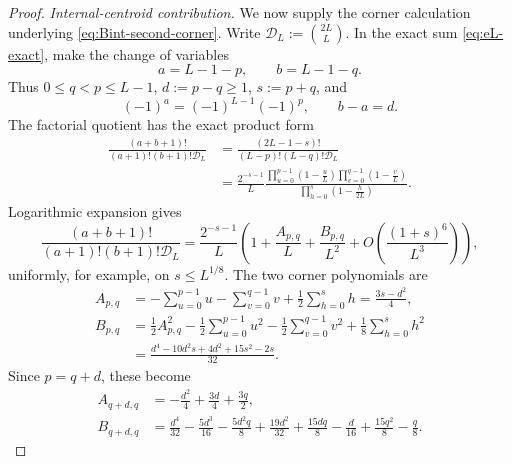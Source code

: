 \documentclass[10pt,a4paper]{amsart}
\begin{document}
\begin{proof}
\medskip
\noindent\emph{Internal-centroid contribution.}
We now supply the corner calculation underlying
\eqref{eq:Bint-second-corner}.  Write
\(\mathscr D_L:=\binom{2L}{L}\).  In the exact sum
\eqref{eq:eL-exact}, make the change of variables
\[
 a=L-1-p,\qquad b=L-1-q.
\]
Thus \(0\le q<p\le L-1\), \(d:=p-q\ge1\), \(s:=p+q\), and
\[
 (-1)^a=(-1)^{L-1}(-1)^p,\qquad b-a=d.
\]
The factorial quotient has the exact product form
\begin{align}
 \frac{(a+b+1)!}{(a+1)!(b+1)!\mathscr D_L}
 &=\frac{(2L-1-s)!}{(L-p)!(L-q)!\mathscr D_L}\nonumber\\
 &=\frac{2^{-s-1}}{L}
 \frac{\displaystyle
   \prod_{u=0}^{p-1}\left(1-\frac{u}{L}\right)
   \prod_{v=0}^{q-1}\left(1-\frac{v}{L}\right)}
 {\displaystyle
   \prod_{h=0}^{s}\left(1-\frac{h}{2L}\right)}.
 \label{eq:eL-corner-product}
\end{align}
Logarithmic expansion gives
\begin{equation}
 \frac{(a+b+1)!}{(a+1)!(b+1)!\mathscr D_L}
 =\frac{2^{-s-1}}{L}
 \left(
 1+\frac{A_{p,q}}{L}+\frac{B_{p,q}}{L^2}
 +O\!\left(\frac{(1+s)^6}{L^3}\right)\right),
 \label{eq:eL-corner-expansion}
\end{equation}
uniformly, for example, on \(s\le L^{1/8}\).  The two corner
polynomials are
\begin{align}
 A_{p,q}
 &=-\sum_{u=0}^{p-1}u-\sum_{v=0}^{q-1}v
 +\frac12\sum_{h=0}^{s}h
 =\frac{3s-d^2}{4},
 \label{eq:eL-first-corner-polynomial}\\
 B_{p,q}
 &=\frac12A_{p,q}^2
 -\frac12\sum_{u=0}^{p-1}u^2
 -\frac12\sum_{v=0}^{q-1}v^2
 +\frac18\sum_{h=0}^{s}h^2\nonumber\\
 &=\frac{d^4-10d^2s+4d^2+15s^2-2s}{32}.
 \label{eq:eL-second-corner-polynomial}
\end{align}
Since \(p=q+d\), these become
\begin{align}
 A_{q+d,q}
 &=-\frac{d^2}{4}+\frac{3d}{4}+\frac{3q}{2},
 \label{eq:eL-A-qd}\\
 B_{q+d,q}
 &=\frac{d^4}{32}-\frac{5d^3}{16}
 -\frac{5d^2q}{8}+\frac{19d^2}{32}
 +\frac{15dq}{8}-\frac{d}{16}
 +\frac{15q^2}{8}-\frac{q}{8}.
 \label{eq:eL-B-qd}
\end{align}


\end{proof}
\end{document}
